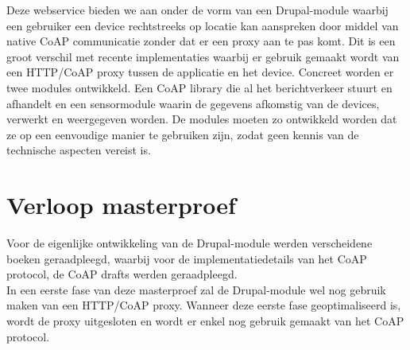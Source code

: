 Deze webservice bieden we aan onder de vorm van een Drupal-module waarbij een gebruiker een device rechtstreeks op locatie kan aanspreken door middel van native CoAP communicatie zonder dat er een proxy aan te pas komt. Dit is een groot verschil met recente implementaties waarbij er gebruik gemaakt wordt van een HTTP/CoAP proxy tussen de applicatie en het device. Concreet worden er twee modules ontwikkeld. Een CoAP library die al het berichtverkeer stuurt en afhandelt en een sensormodule waarin de gegevens afkomstig van de devices, verwerkt en weergegeven worden. De modules moeten zo ontwikkeld worden dat ze op een eenvoudige manier te gebruiken zijn, zodat geen kennis van de technische aspecten vereist is.\\

\section{Verloop masterproef}
Voor de eigenlijke ontwikkeling van de Drupal-module werden verscheidene boeken geraadpleegd, waarbij voor de implementatiedetails van het CoAP protocol, de CoAP drafts werden geraadpleegd.\\
In een eerste fase van deze masterproef zal de Drupal-module wel nog gebruik maken van een HTTP/CoAP proxy. Wanneer deze eerste fase geoptimaliseerd is, wordt de proxy uitgesloten en wordt er enkel nog gebruik gemaakt van het CoAP protocol.\\

